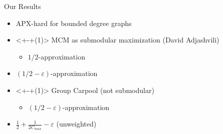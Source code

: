 \begin{frame}[<+>]{Our Results}
\begin{itemize}
  	\item APX-hard for bounded degree graphs 
	\item<+-+(1)> MCM as submodular maximization (David Adjashvili) 
		\begin{itemize}
		  \item $1/2$-approximation 
		\end{itemize}
	\item $(1/2 - \varepsilon)$-approximation 
	\item<+-+(1)> Group Carpool (not submodular)
		\begin{itemize}
			\item $(1/2 - \varepsilon)$-approximation
		\end{itemize}
	\item $\frac{1}{2} + \frac{1}{2C_{max}} - \varepsilon$ (unweighted)
\end{itemize}
\end{frame}
